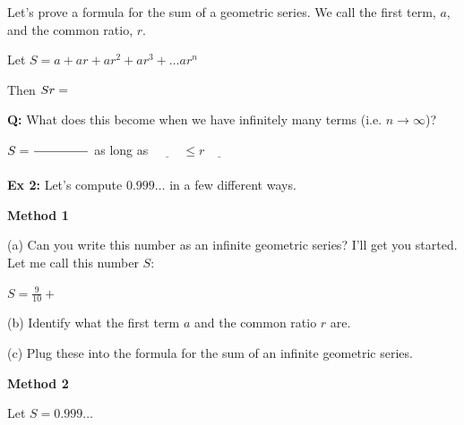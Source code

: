 \documentclass[fleqn]{article}
\theoremstyle{definition}
\begin{document}
\vspace{.25cm}
Let's prove a formula for the sum of a geometric series. We call the first term, $a$, and the common ratio, $r$.

\vspace{.25cm}
    \hspace{1cm} Let \hspace{.35cm} $S = a + ar + ar^2 + ar^3 + \ldots ar^n$

\vspace{.25cm}
    \hspace{1cm} Then \hspace{0cm} $Sr = \hspace{.5cm} $

\vspace{3cm}
\textbf{Q:} What does this become when we have infinitely many terms (i.e. $n \rightarrow \infty$)? 

    \vspace{.25cm}
    \hspace{1cm} $S = \displaystyle{ \frac{ \hspace{1.5cm}}{ } }$ \hspace{.5cm} as long as $\underline{\hspace{1cm}} \leq r \underline{\hspace{1cm}}$

\vspace{1cm}



\textbf{Ex 2:} Let's compute $0.999 \ldots$ in a few different ways. 

\vspace{.25cm}
\textbf{Method 1}

\vspace{.1cm}
(a) Can you write this number as an infinite geometric series? I'll get you started. Let me call this number $S$: 

    \hspace{1cm} $S = \displaystyle{ \frac{9}{10} + }$

\vspace{.5cm}
(b) Identify what the first term $a$ and the common ratio $r$ are. 

\vspace{1.5cm}
(c) Plug these into the formula for the sum of an infinite geometric series. 


\newpage

\textbf{Method 2}

\vspace{1.25cm}
Let $S = 0.999 \ldots$
\end{document}
